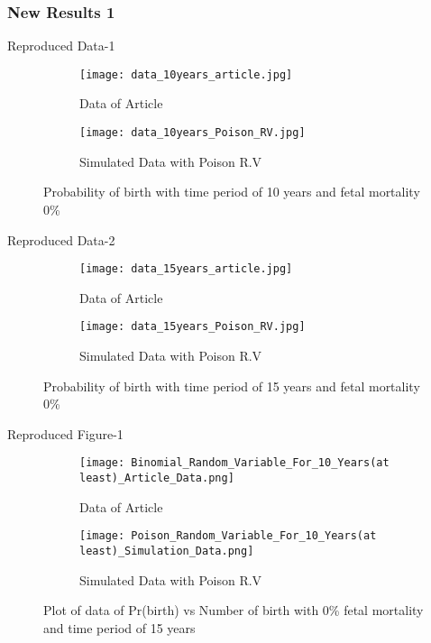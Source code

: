\documentclass{article}
\begin{document}
\subsubsection{New Results 1}
\item Reproduced Data-1\\
\begin{figure}[htp]
\centering
\begin{subfigure}{.5\textwidth}
  \centering
  \texttt{[image: data\_10years\_article.jpg]}
  \caption{Data of Article}
  \label{fig:sub1}
\end{subfigure}%
\begin{subfigure}{.5\textwidth}
  \centering
  \texttt{[image: data\_10years\_Poison\_RV.jpg]}
  \caption{Simulated Data with Poison R.V}
  \label{fig:sub2}
\end{subfigure}
\caption{Probability of birth with time period of 10 years and fetal mortality 0\%}
\label{fig:test}
\end{figure}
\newpage
\item Reproduced Data-2\\
\begin{figure}[htp]
\centering
\begin{subfigure}{.5\textwidth}
  \centering
  \texttt{[image: data\_15years\_article.jpg]}
  \caption{Data of Article}
  \label{fig:sub1}
\end{subfigure}%
\begin{subfigure}{.5\textwidth}
  \centering
  \texttt{[image: data\_15years\_Poison\_RV.jpg]}
  \caption{Simulated Data with Poison R.V}
  \label{fig:sub2}
\end{subfigure}
\caption{Probability of birth with time period of 15 years and fetal mortality 0\%}
\label{fig:test}
\end{figure}
\newline
\newline
\item Reproduced Figure-1
\begin{figure}[htp]
\centering
\begin{subfigure}{.5\textwidth}
  \centering
  \texttt{[image: Binomial\_Random\_Variable\_For\_10\_Years(at least)\_Article\_Data.png]}
  \caption{Data of Article}
  \label{fig:sub1}
\end{subfigure}%
\begin{subfigure}{.5\textwidth}
  \centering
  \texttt{[image: Poison\_Random\_Variable\_For\_10\_Years(at least)\_Simulation\_Data.png]}
  \caption{Simulated Data with Poison R.V}
  \label{fig:sub2}
\end{subfigure}
\caption{Plot of data of Pr(birth) vs Number of birth with 0\% fetal mortality and time period of 15 years}
\label{fig:test}
\end{figure}
\end{document}
